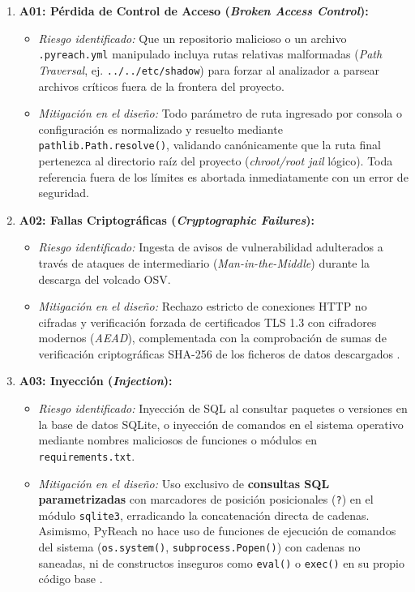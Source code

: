 \begin{enumerate}
    \item \textbf{A01: Pérdida de Control de Acceso (\textit{Broken Access Control}):}
    \begin{itemize}
        \item \textit{Riesgo identificado:} Que un repositorio malicioso o un archivo \texttt{.\allowbreak pyreach.\allowbreak yml} manipulado incluya rutas relativas malformadas (\textit{Path Traversal}, ej. \texttt{.\allowbreak .\allowbreak /\allowbreak .\allowbreak .\allowbreak /\allowbreak etc/\allowbreak shadow}) para forzar al analizador a parsear archivos críticos fuera de la frontera del proyecto.
        \item \textit{Mitigación en el diseño:} Todo parámetro de ruta ingresado por consola o configuración es normalizado y resuelto mediante \texttt{pathlib.\allowbreak Path.\allowbreak resolve()}, validando canónicamente que la ruta final pertenezca al directorio raíz del proyecto (\textit{chroot/root jail} lógico). Toda referencia fuera de los límites es abortada inmediatamente con un error de seguridad.
    \end{itemize}

    \item \textbf{A02: Fallas Criptográficas (\textit{Cryptographic Failures}):}
    \begin{itemize}
        \item \textit{Riesgo identificado:} Ingesta de avisos de vulnerabilidad adulterados a través de ataques de intermediario (\textit{Man-in-the-Middle}) durante la descarga del volcado OSV.
        \item \textit{Mitigación en el diseño:} Rechazo estricto de conexiones HTTP no cifradas y verificación forzada de certificados TLS 1.3 con cifradores modernos (\textit{AEAD}), complementada con la comprobación de sumas de verificación criptográficas SHA-256 de los ficheros de datos descargados \cite{openssf2023osv}.
    \end{itemize}

    \item \textbf{A03: Inyección (\textit{Injection}):}
    \begin{itemize}
        \item \textit{Riesgo identificado:} Inyección de SQL al consultar paquetes o versiones en la base de datos SQLite, o inyección de comandos en el sistema operativo mediante nombres maliciosos de funciones o módulos en \texttt{requirements.\allowbreak txt}.
        \item \textit{Mitigación en el diseño:} Uso exclusivo de \textbf{consultas SQL parametrizadas} con marcadores de posición posicionales (\texttt{?}) en el módulo \texttt{sqlite3}, erradicando la concatenación directa de cadenas. Asimismo, PyReach no hace uso de funciones de ejecución de comandos del sistema (\texttt{os.\allowbreak system()}, \texttt{subprocess.\allowbreak Popen()}) con cadenas no saneadas, ni de constructos inseguros como \texttt{eval()} o \texttt{exec()} en su propio código base \cite{martin2008clean}.
    \end{itemize}


\end{enumerate}
